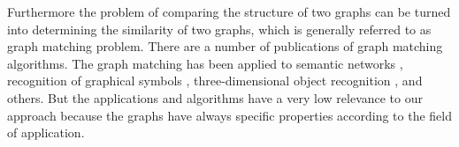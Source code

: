 Furthermore the problem of comparing the structure of two graphs
can be turned into determining the similarity of two graphs,
which is generally referred to as graph matching problem.
There are a number of publications of graph matching algorithms.
The graph matching has been applied to semantic networks \cite{ehring_semantic_networks}, 
recognition of graphical symbols \cite{jiang_graphical_symbols}, 
three-dimensional object recognition \cite{wong_model_matching}, 
and others.
But the applications and algorithms have a very low relevance to our approach 
because the graphs have always specific properties according to the field of application.
